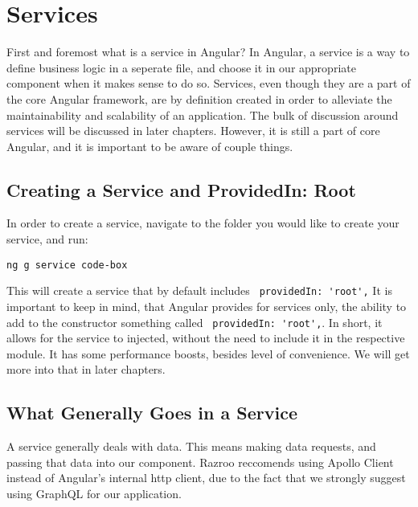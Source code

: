 \section{ Services }
\maketitle{}

First and foremost what is a service in Angular? In Angular, a service is a way
to define business logic in a seperate file, and choose it in our appropriate 
component when it makes sense to do so. Services, even though they are a part 
of the core Angular framework, are by definition created in order to alleviate 
the maintainability and scalability of an application. The bulk of discussion 
around services will be discussed in later chapters. However, it is still a 
part of core Angular, and it is important to be aware of couple things. 

\subsection{ Creating a Service and ProvidedIn: Root }
In order to create a service, navigate to the folder you would like to create 
your service, and run: 
\begin{lstlisting}
ng g service code-box  
\end{lstlisting}

This will create a service that by default includes 
\lstinline{ providedIn: 'root',} It is important to keep in mind, that Angular
provides for services only, the  ability to add to the constructor something 
called \lstinline{ providedIn: 'root',}. In short, it allows for the service 
to injected, without the need to include it in the respective module. It has 
some performance boosts, besides level of convenience. We will get more into 
that in later chapters. 

\subsection{ What Generally Goes in a Service }
A service generally deals with data. This means making data requests, and 
passing that data into our component. Razroo reccomends using Apollo Client
instead of Angular's internal http client, due to the fact that we strongly 
suggest using GraphQL for our application. 
